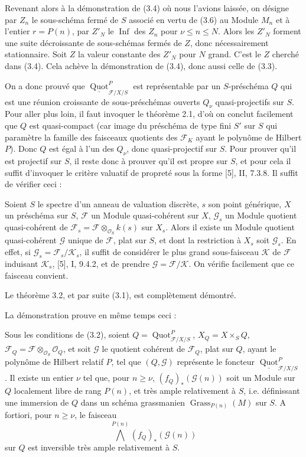 Revenant alors à la démonstration de (3.4) où nous l'avions laissée, on désigne
par $Z_n$ le sous-schéma fermé de $S$ associé en vertu de (3.6) au Module $M_n$
et à l'entier $r=P(n)$, par $Z'_N$ le $\operatorname{Inf}$ des $Z_n$ pour
$\nu\leq n\leq N$. Alors les $Z'_N$ forment une suite décroissante de
sous-schémas fermés de $Z$, donc nécessairement stationnaire. Soit $Z$ la
valeur constante des $Z'_N$ pour $N$ grand. C'est le $Z$ cherché dans (3.4).
Cela achève la démonstration de (3.4), donc aussi celle de (3.3).

On a donc prouvé que
$\underline{\operatorname{Quot}}^P_{\mathcal F/X/S}$ est représentable par un
$S$-préschéma $Q$ qui est une réunion croissante de sous-préschémas ouverts
$Q_\nu$ quasi-projectifs sur $S$. Pour aller plus loin, il faut invoquer le
théorème 2.1, d'où on conclut facilement que $Q$ est quasi-compact (car image du
préschéma de type fini $S'$ sur $S$ qui paramètre la famille des faisceaux
quotients des $\mathcal F_K$ ayant le polynôme de Hilbert $P$). Donc $Q$ est
égal à l'un des $Q_\nu$, donc quasi-projectif sur $S$. Pour prouver qu'il est
projectif sur $S$, il reste donc à prouver qu'il est propre sur $S$, et pour
cela il suffit d'invoquer le critère valuatif de propreté sous la forme [5],
II, 7.3.8. Il suffit de vérifier ceci :

 Soient $S$ le spectre d'un anneau de valuation discrète,
$s$ son point générique, $X$ un préschéma sur $S$, $\mathcal F$ un Module
quasi-cohérent sur $X$, $\mathcal G_s$ un Module quotient quasi-cohérent de
$\mathcal F_s=\mathcal F\otimes_{\mathcal O_S}k(s)$ sur $X_s$. Alors il existe
un Module quotient quasi-cohérent $\mathcal G$ unique de $\mathcal F$, plat sur
$S$, et dont la restriction à $X_s$ soit $\mathcal G_s$.
En effet, si $\mathcal G_s=\mathcal F_s/\mathcal K_s$, il suffit de considérer
le plus grand sous-faisceau $\mathcal K$ de $\mathcal F$ induisant
$\mathcal K_s$, [5], I, 9.4.2, et de prendre
$\mathcal G=\mathcal F/\mathcal K$. On vérifie facilement que ce faisceau
convient.

Le théorème 3.2, et par suite (3.1), est complètement démontré.

La démonstration prouve en même temps ceci :

 Sous les conditions de (3.2), soient
$Q=\operatorname{Quot}^P_{\mathcal F/X/S}$, $X_Q=X\times_SQ$,
$\mathcal F_Q=\mathcal F\otimes_{\mathcal O_S}\mathcal O_Q$, et soit
$\mathcal G$ le quotient cohérent de $\mathcal F_Q$, plat sur $Q$, ayant le
polynôme de Hilbert relatif $P$, tel que $(Q,\mathcal G)$ représente le foncteur
$\underline{\operatorname{Quot}}^P_{\mathcal F/X/S}$. Il existe un entier
$\nu$ tel que, pour $n\geq\nu$, $(f_Q)_*(\mathcal G(n))$ soit un Module sur $Q$
localement libre de rang $P(n)$, et très ample relativement à $S$, i.e.
définissant une immersion de $Q$ dans un schéma grassmanien
$\operatorname{Grass}_{P(n)}(M)$ sur $S$. A fortiori, pour $n\geq\nu$, le
faisceau
\[
\bigwedge^{P(n)}(f_Q)_*(\mathcal G(n))
\]
sur $Q$ est inversible très ample relativement à $S$.

